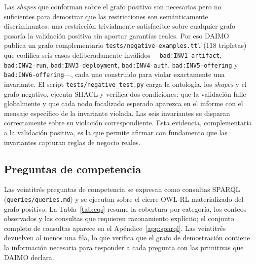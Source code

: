 \documentclass[11pt,a4paper]{article}
\newcommand{\code}[1]{\texttt{#1}}
\begin{document}
Las \emph{shapes} que conforman sobre el grafo positivo son necesarias pero no suficientes para demostrar que las restricciones son semánticamente discriminantes: una restricción trivialmente satisfacible sobre cualquier grafo pasaría la validación positiva sin aportar garantías reales. Por eso DAIMO publica un grafo complementario \code{tests/negative-examples.ttl} (118 tripletas) que codifica seis casos deliberadamente inválidos ---\code{bad:INV1-artifact}, \code{bad:INV2-run}, \code{bad:INV3-deployment}, \code{bad:INV4-auth}, \code{bad:INV5-offering} y \code{bad:INV6-offering}---, cada uno construido para violar exactamente una invariante. El script \code{tests/negative\_test.py} carga la ontología, los \emph{shapes} y el grafo negativo, ejecuta SHACL y verifica dos condiciones: que la validación falle globalmente y que cada nodo focalizado esperado aparezca en el informe con el mensaje específico de la invariante violada. Las seis invariantes se disparan correctamente sobre su violación correspondiente. Esta evidencia, complementaria a la validación positiva, es la que permite afirmar con fundamento que las invariantes capturan reglas de negocio reales.

\subsection{Preguntas de competencia}\label{sec:eval-cqs}

Las veintitrés preguntas de competencia se expresan como consultas SPARQL (\code{queries/queries.md}) y se ejecutan sobre el cierre OWL-RL materializado del grafo positivo. La Tabla~\ref{tab:cqs} resume la cobertura por categoría, los conteos observados y las consultas que requieren razonamiento explícito; el conjunto completo de consultas aparece en el Apéndice~\ref{app:sparql}. Las veintitrés devuelven al menos una fila, lo que verifica que el grafo de demostración contiene la información necesaria para responder a cada pregunta con las primitivas que DAIMO declara.
\end{document}
